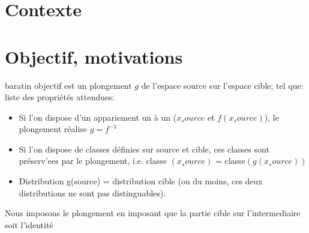 

\chapter{Contexte}


\chapter{Objectif, motivations}
baratin
objectif est un plongement $g$ de l'espace source sur l'espace cible; tel que:
liste des propriétés attendues:
\begin{itemize}
\item Si l'on dispose d'un appariement un à un ($x_source$ et $f(x_source)$), le plongement réalise $g = f^{-1}$
\item Si l'on dispose de classes définies sur source et cible, ces classes sont préserv'ees par le plongement, i.e. classe $(x_source)$ = classe$(g(x_source))$
\item Distribution g(source) = distribution cible (ou du moins, ces deux distributions ne sont pas distinguables).
\end{itemize}

Nous imposons le plongement en imposant que la partie cible sur l'intermediaire soit l'identité 

